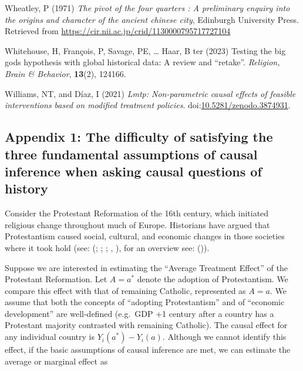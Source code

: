 \documentclass[
  singlecolumn,
  9pt]{article}
\begin{document}
\begin{CSLReferences}
Wheatley, P (1971) \emph{The pivot of the four quarters : A preliminary
enquiry into the origins and character of the ancient chinese city},
Edinburgh University Press. Retrieved from
\url{https://cir.nii.ac.jp/crid/1130000795717727104}

Whitehouse, H, François, P, Savage, PE, \ldots{} Haar, B ter (2023)
Testing the big gods hypothesis with global historical data: A review
and {``}retake{''}. \emph{Religion, Brain \& Behavior}, \textbf{13}(2),
124166.

Williams, NT, and Díaz, I (2021) \emph{Lmtp: Non-parametric causal
effects of feasible interventions based on modified treatment policies}.
doi:\href{https://doi.org/10.5281/zenodo.3874931}{10.5281/zenodo.3874931}.

\end{CSLReferences}

\newpage{}

\subsection{Appendix 1: The difficulty of satisfying the three
fundamental assumptions of causal inference when asking causal questions
of
history}\label{appendix-1-the-difficulty-of-satisfying-the-three-fundamental-assumptions-of-causal-inference-when-asking-causal-questions-of-history}

Consider the Protestant Reformation of the 16th century, which initiated
religious change throughout much of Europe. Historians have argued that
Protestantism caused social, cultural, and economic changes in those
societies where it took hold (see: (; ;
; , ), for an overview see:
()).

Suppose we are interested in estimating the ``Average Treatment Effect''
of the Protestant Reformation. Let \(A = a^*\) denote the adoption of
Protestantism. We compare this effect with that of remaining Catholic,
represented as \(A = a\). We assume that both the concepts of ``adopting
Protestantism'' and of ``economic development'' are well-defined
(e.g.~GDP +1 century after a country has a Protestant majority
contrasted with remaining Catholic). The causal effect for any
individual country is \(Y_i(a^*) - Y_i(a)\). Although we cannot identify
this effect, if the basic assumptions of causal inference are met, we
can estimate the average or marginal effect as
\end{document}
